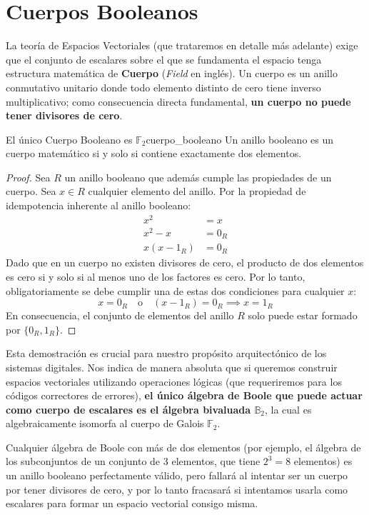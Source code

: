 \section{Cuerpos Booleanos}

La teoría de Espacios Vectoriales (que trataremos en detalle más adelante) exige que el conjunto de escalares sobre el que se fundamenta el espacio tenga estructura matemática de \textbf{Cuerpo} (\textit{Field} en inglés). Un cuerpo es un anillo conmutativo unitario donde todo elemento distinto de cero tiene inverso multiplicativo; como consecuencia directa fundamental, \textbf{un cuerpo no puede tener divisores de cero}.

\begin{teorema}{El único Cuerpo Booleano es $\mathbb{F}_2$}{cuerpo_booleano}
Un anillo booleano es un cuerpo matemático si y solo si contiene exactamente dos elementos.
\end{teorema}
\begin{proof}
Sea $R$ un anillo booleano que además cumple las propiedades de un cuerpo. Sea $x \in R$ cualquier elemento del anillo.
Por la propiedad de idempotencia inherente al anillo booleano:
\begin{align*}
x^2 &= x \\
x^2 - x &= 0_R \\
x(x - 1_R) &= 0_R
\end{align*}
Dado que en un cuerpo no existen divisores de cero, el producto de dos elementos es cero si y solo si al menos uno de los factores es cero. Por lo tanto, obligatoriamente se debe cumplir una de estas dos condiciones para cualquier $x$:
\[ x = 0_R \quad \text{o} \quad (x - 1_R) = 0_R \implies x = 1_R \]
En consecuencia, el conjunto de elementos del anillo $R$ solo puede estar formado por $\{0_R, 1_R\}$. 
\end{proof}

Esta demostración es crucial para nuestro propósito arquitectónico de los sistemas digitales. Nos indica de manera absoluta que si queremos construir espacios vectoriales utilizando operaciones lógicas (que requeriremos para los códigos correctores de errores), \textbf{el único álgebra de Boole que puede actuar como cuerpo de escalares es el álgebra bivaluada $\mathbb{B}_2$}, la cual es algebraicamente isomorfa al cuerpo de Galois $\mathbb{F}_2$. 

Cualquier álgebra de Boole con más de dos elementos (por ejemplo, el álgebra de los subconjuntos de un conjunto de 3 elementos, que tiene $2^3=8$ elementos) es un anillo booleano perfectamente válido, pero fallará al intentar ser un cuerpo por tener divisores de cero, y por lo tanto fracasará si intentamos usarla como escalares para formar un espacio vectorial consigo misma.
